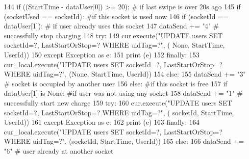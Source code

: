 \begin{DoxyCode}
144             \textcolor{keywordflow}{if} ((StartTime - dataUser[0]) >= 20): \textcolor{comment}{# if last swipe is over 20s ago}
145                 \textcolor{keywordflow}{if} (socketUsed == socketId): \textcolor{comment}{#if this socket is used now}
146                     \textcolor{keywordflow}{if} (socketId == dataUser[1]): \textcolor{comment}{# if user already uses this socket}
147                         dataSend += \textcolor{stringliteral}{"4"} \textcolor{comment}{# successfully stop charging}
148                         \textcolor{keywordflow}{try}:
149                             cur.execute(\textcolor{stringliteral}{"UPDATE users SET socketId=?, LastStartOrStop=? WHERE uidTag=?"}, (\textcolor{keywordtype}{
      None}, StartTime, UserId))             
150                         \textcolor{keywordflow}{except} Exception \textcolor{keyword}{as} e:
151                             \textcolor{keywordflow}{print} (e)
152                         \textcolor{keywordflow}{finally}:
153                             cur\_local.execute(\textcolor{stringliteral}{"UPDATE users SET socketId=?, LastStartOrStop=? WHERE
       uidTag=?"}, (\textcolor{keywordtype}{None}, StartTime, UserId))
154                     \textcolor{keywordflow}{else}:
155                         dataSend += \textcolor{stringliteral}{"3"} \textcolor{comment}{# socket is occupied by another user }
156                 \textcolor{keywordflow}{else}: \textcolor{comment}{#if this socket is free}
157                     \textcolor{keywordflow}{if} dataUser[1] \textcolor{keywordflow}{is} \textcolor{keywordtype}{None}: \textcolor{comment}{#if user was not using any socket}
158                         dataSend += \textcolor{stringliteral}{"1"} \textcolor{comment}{# successfully start new charge}
159                         \textcolor{keywordflow}{try}:
160                             cur.execute(\textcolor{stringliteral}{"UPDATE users SET socketId=?, LastStartOrStop=? WHERE uidTag=?"}, (
      socketId, StartTime, UserId))
161                         \textcolor{keywordflow}{except} Exception \textcolor{keyword}{as} e:
162                             \textcolor{keywordflow}{print} (e)
163                         \textcolor{keywordflow}{finally}:
164                             cur\_local.execute(\textcolor{stringliteral}{"UPDATE users SET socketId=?, LastStartOrStop=? WHERE
       uidTag=?"}, (socketId, StartTime, UserId))
165                     \textcolor{keywordflow}{else}:
166                         dataSend += \textcolor{stringliteral}{"6"} \textcolor{comment}{# user already at another socket}

\end{DoxyCode}
